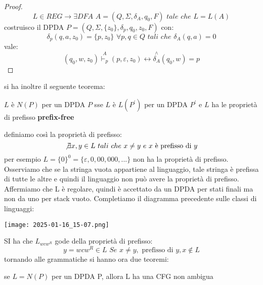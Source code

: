 	\begin{proof}
		$$L\in REG\to\exists DFA\,\,A=(Q,\Sigma,\delta_A,q_0,F)\,\,tale\,\,che\,\, L=L(A)$$
		costruisco il DPDA $P=(Q,\Sigma,\{z_0\},\delta_p,q_0,z_0,F)$ con:
		$$\delta_p(q,a,z_0)=\{p,z_0\}\,\,\forall p,q\in Q\,\,tali\,\,che\,\,\delta_A(q,a)=0$$
		vale:
		$$(q_0,w,z_0)\stackrel{A}{\vdash_p}(p,\varepsilon,z_0)\longleftrightarrow \stackrel{\wedge}{\delta_A}(q_0,w)=p$$
	\end{proof}
	si ha inoltre il seguente teorema:
	\begin{theorem}
		$L$ è $N(P)$ per un DPDA $P$ sse $L$ è $L(P^{'})$ per un DPDA $P^{'}$ e $L$ ha le proprietà di prefisso \textbf{prefix-free}
	\end{theorem}
	definiamo così la proprietà di prefisso:
	$$\not\exists x,y\in L\,\,tali\,\,che\,\,x\neq y\,\,e\,\, x \mbox{ è prefisso di } y$$
	per esempio $L=\{0\}^0=\{\varepsilon,0,00,000,...\}$ non ha la proprietà di prefisso. Osserviamo che se la stringa vuota appartiene al linguaggio, tale stringa è prefissa di tutte le altre e quindi il linguaggio non può avere la proprietà di prefisso. Affermiamo che L è regolare, quindi è accettato da un DPDA per stati finali ma non da uno per stack vuoto. Completiamo il diagramma precedente sulle classi di
	linguaggi:
	\begin{center}
\texttt{[image: 2025-01-16\_15-07.png]}

	\end{center}
	SI ha che $L_{wcw^R}$ gode della proprietà di prefisso:
	$$y=wcw^R\in L\,\, Se\,\,x\neq y,\mbox{ prefisso di } y,x\not\in L$$
	tornando alle grammatiche si hanno ora due teoremi:
	\begin{theorem}
		se $L=N(P)$ per un DPDA P, allora L ha una CFG non ambigua
	\end{theorem}
